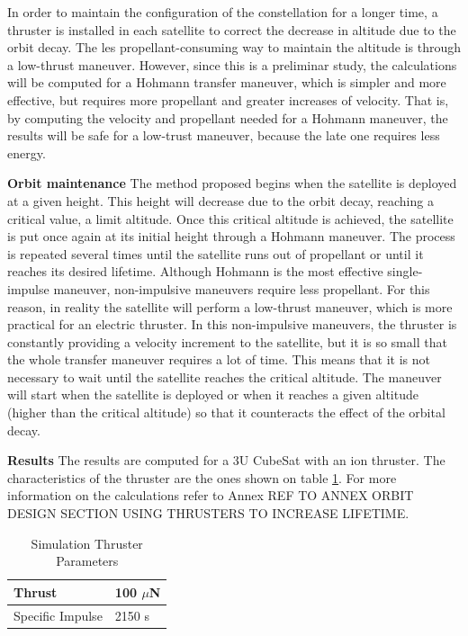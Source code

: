 In order to maintain the configuration of the constellation for a longer time, a thruster is installed in each satellite to correct the decrease in altitude due to the orbit decay. The les propellant-consuming way to maintain the altitude is through a low-thrust maneuver. However, since this is a preliminar study, the calculations will be computed for a Hohmann transfer maneuver, which is simpler and more effective, but requires more propellant and greater increases of velocity. That is, by computing the velocity and propellant needed for a Hohmann maneuver, the results will be safe for a low-trust maneuver, because the late one requires less energy.

\textbf{Orbit maintenance}
The method proposed begins when the satellite is deployed at a given height. This height will decrease due to the orbit decay, reaching a critical value, a limit altitude. Once this critical altitude is achieved, the satellite is put once again at its initial height through a Hohmann maneuver.
The process is repeated several times until the satellite runs out of propellant or until it reaches its desired lifetime.
\newline
Although Hohmann is the most effective single-impulse maneuver, non-impulsive maneuvers require less propellant. For this reason, in reality the satellite will perform a low-thrust maneuver, which is more practical for an electric thruster. In this non-impulsive maneuvers, the thruster is constantly providing a velocity increment to the satellite, but it is so small that the whole transfer maneuver requires a lot of time. This means that it is not necessary to wait until the satellite reaches the critical altitude. The maneuver will start when the satellite is deployed or when it reaches a given altitude (higher than the critical altitude) so that it counteracts the effect of the orbital decay.

\textbf{Results}
The results are computed for a 3U CubeSat with an ion thruster. The characteristics of the thruster are the ones shown on table \ref{thrustspimpulse}. For more information on the calculations refer to Annex REF TO ANNEX ORBIT DESIGN SECTION USING THRUSTERS TO INCREASE LIFETIME.

\begin{table}[h!]
\begin{center}
\begin{tabular}{ | l | l | }
\hline
Thrust & 100 $\mu$N \\ 
\hline 
Specific Impulse & 2150 s \\
\hline
\end{tabular}
\caption{Simulation Thruster Parameters}
\label{thrustspimpulse}
\end{center}
\end{table}

